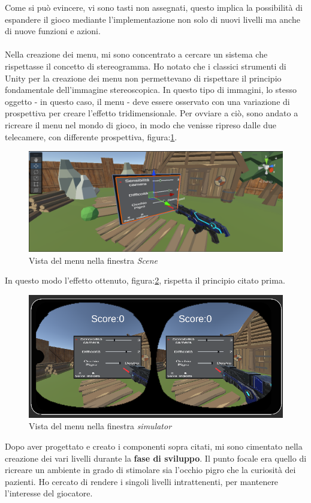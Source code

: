 \documentclass[
a4paper,
cleardoublepage=empty,
headings=twolinechapter,
numbers=autoenddot,
]{scrbook}
\begin{document}
     Come si può evincere, vi sono tasti non assegnati, questo implica la possibilità di espandere il gioco mediante l'implementazione non solo di nuovi livelli ma anche di nuove funzioni e azioni.\\\\
     Nella creazione dei menu, mi sono concentrato a cercare un sistema che rispettasse il concetto di stereogramma\cite{Stereogramma}. Ho notato che i classici strumenti di Unity per la creazione dei menu non permettevano di rispettare il principio fondamentale dell'immagine stereoscopica. In questo tipo di immagini, lo stesso oggetto - in questo caso, il menu - deve essere osservato con una variazione di prospettiva per creare l'effetto tridimensionale.
     Per ovviare a ciò, sono andato a ricreare il menu nel mondo di gioco, in modo che venisse ripreso dalle due telecamere, con differente prospettiva, figura:\ref{fig:menu_scena}.
     \begin{figure}[h]
    	\centering
    	\includegraphics[width=0.6\linewidth]{image/menu_scena}
    	\caption{Vista del menu nella finestra \textit{Scene}}
    	\label{fig:menu_scena}
    \end{figure}
    In questo modo l'effetto ottenuto, figura:\ref{fig:menu_simulator}, rispetta il principio citato prima.
     \begin{figure}[h]
    	\centering
    	\includegraphics[width=0.6\linewidth]{image/menu_simulatore}
    	\caption{Vista del menu nella finestra \textit{simulator}}
    	\label{fig:menu_simulator}
    \end{figure}
    Dopo aver progettato e creato i componenti sopra citati, mi sono cimentato nella creazione dei vari livelli durante la \textbf{fase di sviluppo}. Il punto focale era quello di ricreare un ambiente in grado di stimolare sia l'occhio pigro che la curiosità dei pazienti. Ho cercato di rendere i singoli livelli intrattenenti, per mantenere l'interesse del giocatore.
\end{document}

